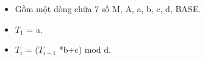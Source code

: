 \begin{itemize}
	\item     Gồm một dòng chứa 7 số M, A, a, b, c, d, BASE.   
	\item     $T_{1}$    = a.   
	\item     $T_{i}$    = ($T_{i-1}$    *b+c) mod d.   
\end{itemize}